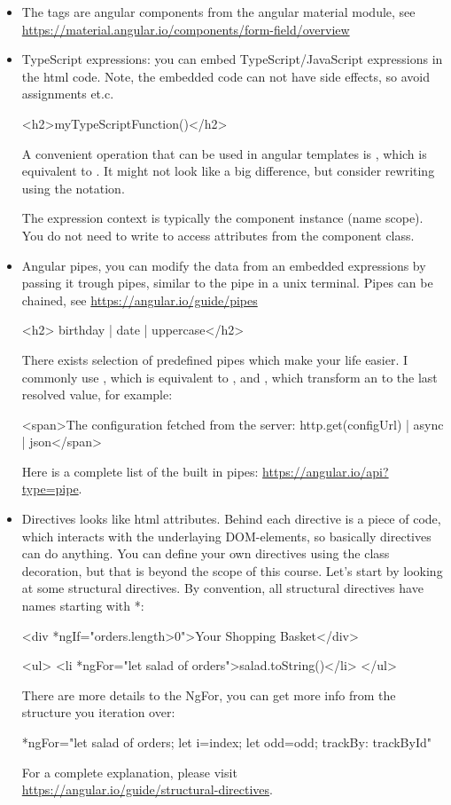 \begin{itemize}
\item The  tags are angular components from the angular material module, see \url{https://material.angular.io/components/form-field/overview}
\item TypeScript expressions: you can embed TypeScript/JavaScript expressions in the html code. Note, the embedded code can not have side effects, so avoid assignments \code{+=, ++} et.c.
\begin{Code}
<h2>{{myTypeScriptFunction()}}</h2>
\end{Code}
A convenient operation that can be used in angular templates is , which is equivalent to . It might not look like a big difference, but consider rewriting  using the  notation.

The expression context is typically the component instance (name scope). You do not need to write  to access attributes from the component class.
\item Angular pipes, you can modify the data from an embedded expressions by passing it trough pipes, similar to the pipe in a unix terminal. Pipes can be chained, see \url{https://angular.io/guide/pipes}
\begin{Code}
<h2>{{ birthday | date | uppercase}}</h2>
\end{Code}
There exists selection of predefined pipes which make your life easier. I commonly use , which is equivalent to , and , which transform an  to the last resolved value, for example:
\begin{Code}
<span>The configuration fetched from the server: 
{{ http.get(configUrl) | async | json}}</span>
\end{Code}
Here is a complete list of the built in pipes: \url{https://angular.io/api?type=pipe}.
\item Directives looks like html attributes. Behind each directive is a piece of code, which interacts with the underlaying DOM-elements, so basically directives can do anything. You can define your own directives using the  class decoration, but that is beyond the scope of this course. Let's start by looking at some structural directives. By convention, all structural directives have names starting with *:
\begin{Code}
<div *ngIf="orders.length>0">Your Shopping Basket</div>

<ul>
  <li *ngFor="let salad of orders">{{salad.toString()}}</li>
</ul>
\end{Code}
There are more details to the NgFor, you can get more info from the structure you iteration over: 
\begin{Code}
*ngFor="let salad of orders; let i=index; let odd=odd; trackBy: trackById"
\end{Code}
For a complete explanation, please visit \\ \url{https://angular.io/guide/structural-directives}.


\end{itemize}
